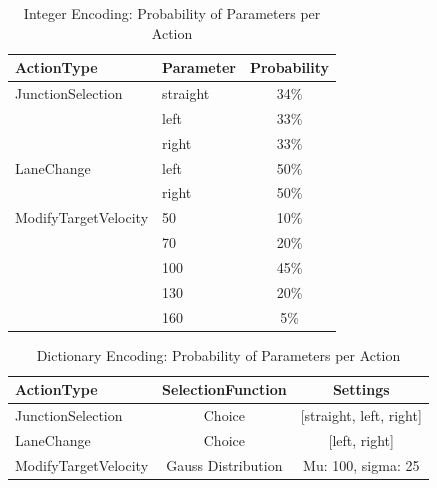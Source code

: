 \begin{table}[ht]
	\centering
	\begin{tabular}{llc}
		\hline
		ActionType & Parameter & Probability \\
		\hline
		JunctionSelection 	& straight & 34\% \\
		& left & 33\% \\
		& right & 33\% \\
		\hline
		LaneChange 			& left & 50\% \\
		& right & 50\% \\
		\hline
		ModifyTargetVelocity & 50 & 10\%\\
		& 70 & 20\%\\
		& 100 & 45\%\\
		& 130 & 20\%\\
		& 160 & 5\%\\
		\hline
	\end{tabular}
	\caption{Integer Encoding: Probability of Parameters per Action}
	\label{tab:appendix:integer_encoding_probabilities}
\end{table}


\begin{table}[ht]
	\centering
	\begin{tabular}{lcc}
		\hline
		ActionType & SelectionFunction & Settings \\
		\hline
		JunctionSelection 	& Choice & [straight, left, right] \\
		LaneChange 			& Choice & [left, right]\\
		ModifyTargetVelocity & Gauss Distribution & Mu: 100, sigma: 25\\
		\hline
	\end{tabular}
	\caption{Dictionary Encoding: Probability of Parameters per Action}
	\label{tab:appendix:dict_encoding_probabilities}
\end{table}


